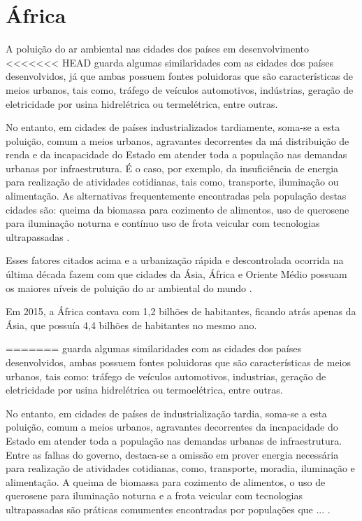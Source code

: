\section{África}

A poluição do ar ambiental nas cidades dos países em desenvolvimento
<<<<<<< HEAD
guarda algumas similaridades com as cidades dos países desenvolvidos, já que 
ambas possuem fontes poluidoras que são características de meios urbanos, 
tais como, tráfego de veículos automotivos, indústrias, geração de 
eletricidade por usina hidrelétrica ou termelétrica, entre outras. 

No entanto, em cidades de países industrializados tardiamente, soma-se a esta 
poluição, comum a meios urbanos, agravantes decorrentes da má distribuição de renda e 
da incapacidade do Estado em atender toda a população nas demandas urbanas 
por infraestrutura. 
É o caso, por exemplo, da insuficiência de energia para realização de atividades cotidianas, 
tais como, transporte, iluminação ou alimentação. 
As alternativas frequentemente encontradas pela população destas cidades são: queima da 
biomassa para cozimento de alimentos, uso de querosene para iluminação 
noturna e contínuo uso de frota veicular com tecnologias ultrapassadas
\citep{brauer2012}.

Esses fatores citados acima e a urbanização rápida e descontrolada ocorrida na
última década fazem com que cidades da Ásia, África e Oriente Médio possuam 
os maiores níveis de poluição do ar ambiental do mundo \citep{brauer2012}.

Em 2015, a África contava com 1,2 bilhões de habitantes, ficando atrás 
apenas da Ásia, que possuía 4,4 bilhões de habitantes no mesmo ano.
 
=======
guarda algumas similaridades com as cidades dos países desenvolvidos,
ambas possuem fontes poluidoras que são características de meios urbanos, 
tais como: tráfego de veículos automotivos, industrias, geração de 
eletricidade por usina hidrelétrica ou termoelétrica, entre outras. 

No entanto, em cidades de países de industrialização tardia, soma-se a esta 
poluição, comum a meios urbanos, agravantes decorrentes da incapacidade do 
Estado em atender toda a população nas demandas urbanas de infraestrutura. 
Entre as falhas do governo, destaca-se a omissão em prover energia 
necessária para realização de atividades cotidianas, como, transporte, 
moradia, iluminação e alimentação. 
A queima de biomassa para cozimento de alimentos, o uso de querosene para 
iluminação noturna e a frota veicular com tecnologias ultrapassadas são práticas
comumentes encontradas por populações que  ...
\citep{brauer2012}.

